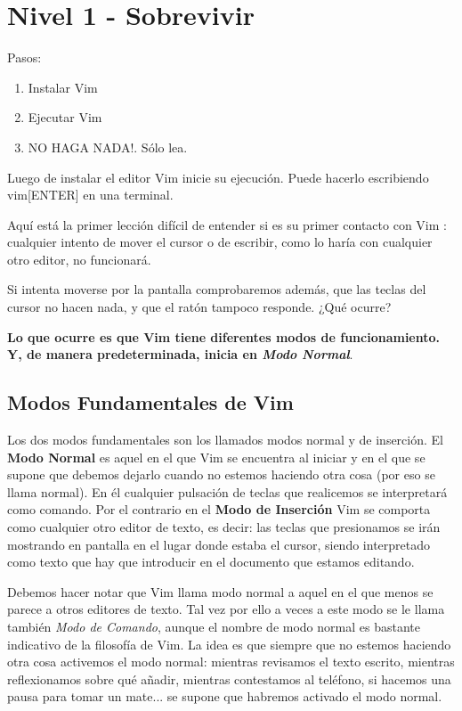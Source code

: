 \documentclass[12pt]{article}
\begin{document}
\section{Nivel 1 - Sobrevivir}


Pasos:

\begin{enumerate}
	\item Instalar Vim
	\item Ejecutar Vim
	\item NO HAGA NADA!. Sólo lea.
\end{enumerate}

Luego de instalar el editor Vim inicie su ejecución. Puede hacerlo
escribiendo vim[ENTER] en una terminal.

Aquí está la primer lección difícil de entender si es su primer contacto
con Vim : cualquier intento de mover el cursor o de escribir, como lo haría con cualquier otro
editor, no funcionará.

Si intenta moverse por la
pantalla comprobaremos además, que las teclas del cursor no hacen nada, y que el
ratón tampoco responde. ¿Qué ocurre? 

\textbf{Lo que ocurre es que Vim tiene diferentes modos de funcionamiento.
Y, de manera predeterminada, inicia en \textit{Modo Normal}}.


\subsection{Modos Fundamentales de Vim}

Los dos modos fundamentales son los llamados modos normal y de inserción. 
El \textbf{Modo Normal} es aquel
en el que Vim se encuentra al iniciar y en el que se supone que debemos
dejarlo cuando no estemos haciendo otra cosa (por eso se llama normal). En él
cualquier pulsación de teclas que realicemos se interpretará como comando. Por
el contrario en el \textbf{Modo de Inserción} Vim se comporta como cualquier
otro editor de texto, es decir: las teclas que presionamos se irán mostrando en
pantalla en el lugar donde estaba el cursor, siendo interpretado como texto que
hay que introducir en el documento que estamos editando.

Debemos hacer notar que Vim llama modo normal a aquel en el que menos se
parece a otros editores de texto. Tal vez por ello a veces a este modo se le
llama también \textit{Modo de Comando}, aunque el nombre de modo normal es bastante
indicativo de la filosofía de Vim. La idea es que siempre que no estemos
haciendo otra cosa activemos el modo normal: mientras revisamos el texto
escrito, mientras reflexionamos sobre qué añadir, mientras contestamos al
teléfono, si hacemos una pausa para tomar un mate...
se supone que habremos activado el modo normal.
\end{document}

